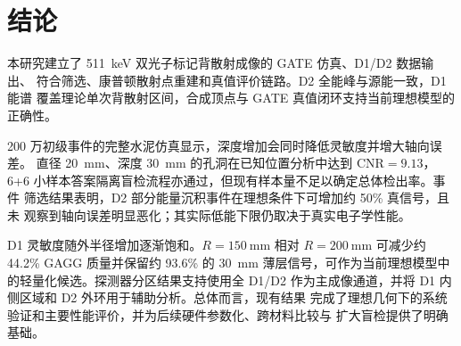 \documentclass[UTF8,a4paper,zihao=-4,fontset=fandol]{ctexart}
\begin{document}
\section{结论}

本研究建立了 511~keV 双光子标记背散射成像的 GATE 仿真、D1/D2 数据输出、
符合筛选、康普顿散射点重建和真值评价链路。D2 全能峰与源能一致，D1 能谱
覆盖理论单次背散射区间，合成顶点与 GATE 真值闭环支持当前理想模型的正确性。

200 万初级事件的完整水泥仿真显示，深度增加会同时降低灵敏度并增大轴向误差。
直径 20~mm、深度 30~mm 的孔洞在已知位置分析中达到 $\mathrm{CNR}=9.13$，
6+6 小样本答案隔离盲检流程亦通过，但现有样本量不足以确定总体检出率。事件
筛选结果表明，D2 部分能量沉积事件在理想条件下可增加约 50\% 真信号，且未
观察到轴向误差明显恶化；其实际低能下限仍取决于真实电子学性能。

D1 灵敏度随外半径增加逐渐饱和。$R=150~\mathrm{mm}$ 相对
$R=200~\mathrm{mm}$ 可减少约 44.2\% GAGG 质量并保留约 93.6\% 的 30~mm
薄层信号，可作为当前理想模型中的轻量化候选。探测器分区结果支持使用全 D1/D2
作为主成像通道，并将 D1 内侧区域和 D2 外环用于辅助分析。总体而言，现有结果
完成了理想几何下的系统验证和主要性能评价，并为后续硬件参数化、跨材料比较与
扩大盲检提供了明确基础。
\end{document}
